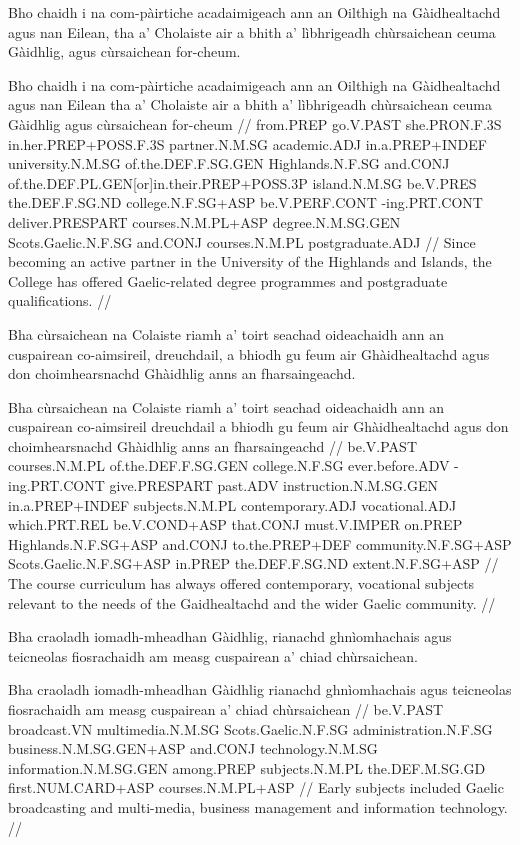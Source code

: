 \documentclass[a4paper,10pt]{article}
\begin{document}
\ex
\begingl
\glpre Bho chaidh i na com-pàirtiche acadaimigeach ann an Oilthigh na Gàidhealtachd agus nan Eilean, tha a' Cholaiste air a bhith a' lìbhrigeadh chùrsaichean ceuma Gàidhlig, agus cùrsaichean for-cheum. 

\vspace{4mm}
\gla Bho chaidh i na com-pàirtiche acadaimigeach {ann an} Oilthigh na Gàidhealtachd agus nan Eilean tha a' Cholaiste {air a bhith} a' lìbhrigeadh chùrsaichean ceuma Gàidhlig agus cùrsaichean for-cheum  //
\glb from.PREP go.V.PAST she.PRON.F.3S in.her.PREP+POSS.F.3S partner.N.M.SG academic.ADJ in.a.PREP+INDEF university.N.M.SG of.the.DEF.F.SG.GEN Highlands.N.F.SG and.CONJ of.the.DEF.PL.GEN[or]in.their.PREP+POSS.3P island.N.M.SG be.V.PRES the.DEF.F.SG.ND college.N.F.SG+ASP be.V.PERF.CONT -ing.PRT.CONT deliver.PRESPART courses.N.M.PL+ASP degree.N.M.SG.GEN Scots.Gaelic.N.F.SG and.CONJ courses.N.M.PL postgraduate.ADJ  //
\glft Since becoming an active partner in the University of the Highlands and Islands, the College has offered Gaelic-related degree programmes and postgraduate qualifications. //
\endgl
\xe

\ex
\begingl
\glpre Bha cùrsaichean na Colaiste riamh a' toirt seachad oideachaidh ann an cuspairean co-aimsireil, dreuchdail, a bhiodh gu feum air Ghàidhealtachd agus don choimhearsnachd Ghàidhlig anns an fharsaingeachd. 

\vspace{4mm}
\gla Bha cùrsaichean na Colaiste riamh a' toirt seachad oideachaidh {ann an} cuspairean co-aimsireil dreuchdail a bhiodh gu feum air Ghàidhealtachd agus don choimhearsnachd Ghàidhlig anns an fharsaingeachd  //
\glb be.V.PAST courses.N.M.PL of.the.DEF.F.SG.GEN college.N.F.SG ever.before.ADV -ing.PRT.CONT give.PRESPART past.ADV instruction.N.M.SG.GEN in.a.PREP+INDEF subjects.N.M.PL contemporary.ADJ vocational.ADJ which.PRT.REL be.V.COND+ASP that.CONJ must.V.IMPER on.PREP Highlands.N.F.SG+ASP and.CONJ to.the.PREP+DEF community.N.F.SG+ASP Scots.Gaelic.N.F.SG+ASP in.PREP the.DEF.F.SG.ND extent.N.F.SG+ASP  //
\glft The course curriculum has always offered contemporary, vocational subjects relevant to the needs of the Gaidhealtachd and the wider Gaelic community. //
\endgl
\xe

\ex
\begingl
\glpre Bha craoladh iomadh-mheadhan Gàidhlig, rianachd ghnìomhachais agus teicneolas fiosrachaidh am measg cuspairean a' chiad chùrsaichean. 

\vspace{4mm}
\gla Bha craoladh iomadh-mheadhan Gàidhlig rianachd ghnìomhachais agus teicneolas fiosrachaidh {am measg} cuspairean a' chiad chùrsaichean  //
\glb be.V.PAST broadcast.VN multimedia.N.M.SG Scots.Gaelic.N.F.SG administration.N.F.SG business.N.M.SG.GEN+ASP and.CONJ technology.N.M.SG information.N.M.SG.GEN among.PREP subjects.N.M.PL the.DEF.M.SG.GD first.NUM.CARD+ASP courses.N.M.PL+ASP  //
\glft Early subjects included Gaelic broadcasting and multi-media, business management and information technology. //
\endgl
\xe
\end{document}
